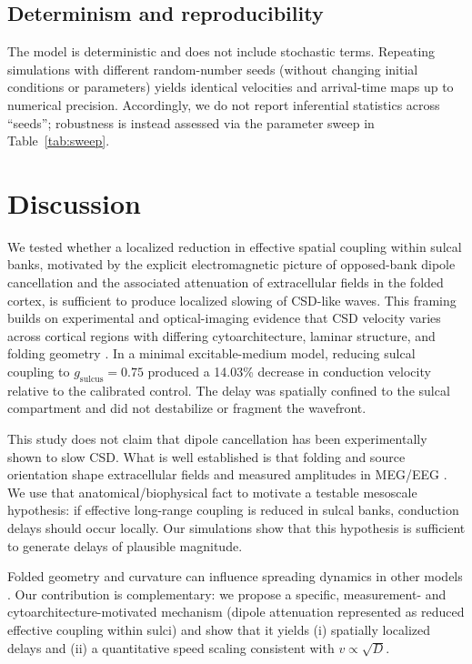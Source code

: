 \documentclass[12pt]{article}
\begin{document}
\subsection{Determinism and reproducibility}

The model is deterministic and does not include stochastic terms. Repeating simulations with different random-number seeds (without changing initial conditions or parameters) yields identical velocities and arrival-time maps up to numerical precision. Accordingly, we do not report inferential statistics across “seeds”; robustness is instead assessed via the parameter sweep in Table~\ref{tab:sweep}.

\section{Discussion}

We tested whether a localized reduction in effective spatial coupling within sulcal banks, motivated by the explicit electromagnetic picture of opposed-bank dipole cancellation and the associated attenuation of extracellular fields in the folded cortex, is sufficient to produce localized slowing of CSD-like waves. This framing builds on experimental and optical-imaging evidence that CSD velocity varies across cortical regions with differing cytoarchitecture, laminar structure, and folding geometry \citep{Vilagi2001,Fujita2016,Santos2014,Santos2017}. In a minimal excitable-medium model, reducing sulcal coupling to $g_{\mathrm{sulcus}}=0.75$ produced a 14.03\% decrease in conduction velocity relative to the calibrated control. The delay was spatially confined to the sulcal compartment and did not destabilize or fragment the wavefront.

This study does not claim that dipole cancellation has been experimentally shown to slow CSD. What is well established is that folding and source orientation shape extracellular fields and measured amplitudes in MEG/EEG \citep{Murakami2006,Ahlfors2010,Muller2023}. We use that anatomical/biophysical fact to motivate a testable mesoscale hypothesis: if effective long-range coupling is reduced in sulcal banks, conduction delays should occur locally. Our simulations show that this hypothesis is sufficient to generate delays of plausible magnitude.

Folded geometry and curvature can influence spreading dynamics in other models \citep{Kenny2019}. Our contribution is complementary: we propose a specific, measurement- and cytoarchitecture-motivated mechanism (dipole attenuation represented as reduced effective coupling within sulci) and show that it yields (i) spatially localized delays and (ii) a quantitative speed scaling consistent with $v\propto \sqrt{D}$.
\end{document}
